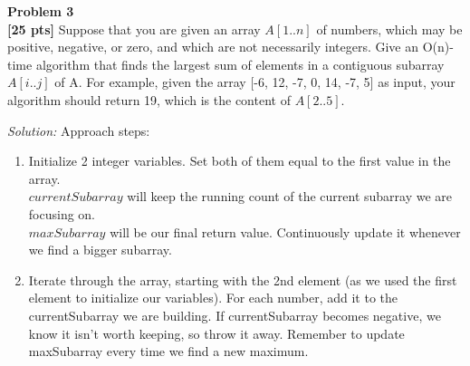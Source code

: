 \documentclass{article}
\newenvironment{problem}[2][Problem]
    { \begin{mdframed}[backgroundcolor=gray!20] \textbf{#1 #2} \\}
    {  \end{mdframed}}
\newenvironment{solution}
    {\textit{Solution:}}
    {}
\begin{document}
\newpage
\begin{problem}{3}
\textbf{[25 pts]}
Suppose that you are given an array $A[1..n]$ of numbers, which may be positive, negative, or zero, and which are not necessarily integers. Give an O(n)-time algorithm that finds the largest sum of elements in a contiguous subarray $A[i..j]$ of A. For example, given the array [-6, 12, -7, 0, 14, -7, 5] as input, your algorithm should return 19, which is the content of $A[2..5]$.
\end{problem}
\begin{solution}
\newline
Approach steps:
\begin{enumerate}
	\item 
	Initialize 2 integer variables. Set both of them equal to the first value in the array.\\
	$currentSubarray$ will keep the running count of the current subarray we are focusing on.\\
	$maxSubarray$ will be our final return value. Continuously update it whenever we find a bigger subarray.
	\item
	Iterate through the array, starting with the 2nd element (as we used the first element to initialize our variables). For each number, add it to the currentSubarray we are building. If currentSubarray becomes negative, we know it isn't worth keeping, so throw it away. Remember to update maxSubarray every time we find a new maximum.
	\begin{algorithm}
	\end{algorithm}
\end{enumerate}
\end{solution}
\end{document}
